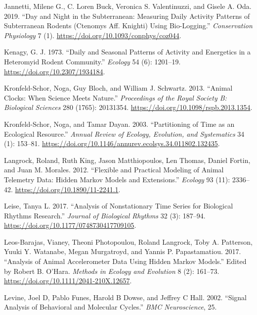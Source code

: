 \documentclass[msc,numbers,hidelinks]{coppe}
\newlength{\cslhangindent}
\newenvironment{CSLReferences}[2] %
 {%
  \setlength{\parindent}{0pt}
  \ifodd #1 \everypar{\setlength{\hangindent}{\cslhangindent}}\ignorespaces\fi
  \ifnum #2 > 0
  \setlength{\parskip}{#2\baselineskip}
  \fi
 }%
 {}
\begin{document}
\begin{CSLReferences}{1}{0}
  \leavevmode{}%
  Jannetti, Milene G., C. Loren Buck, Veronica S. Valentinuzzi, and Gisele A. Oda. 2019. {``Day and Night in the Subterranean: Measuring Daily Activity Patterns of Subterranean Rodents (Ctenomys Aff. Knighti) Using Bio-Logging.''} \emph{Conservation Physiology} 7 (1). \url{https://doi.org/10.1093/conphys/coz044}.

  \leavevmode{}%
  Kenagy, G. J. 1973. {``Daily and {Seasonal Patterns} of {Activity} and {Energetics} in a {Heteromyid Rodent Community}.''} \emph{Ecology} 54 (6): 1201--19. \url{https://doi.org/10.2307/1934184}.

  \leavevmode{}%
  Kronfeld-Schor, Noga, Guy Bloch, and William J. Schwartz. 2013. {``Animal Clocks: When Science Meets Nature.''} \emph{Proceedings of the Royal Society B: Biological Sciences} 280 (1765): 20131354. \url{https://doi.org/10.1098/rspb.2013.1354}.

  \leavevmode{}%
  Kronfeld-Schor, Noga, and Tamar Dayan. 2003. {``Partitioning of {Time} as an {Ecological Resource}.''} \emph{Annual Review of Ecology, Evolution, and Systematics} 34 (1): 153--81. \url{https://doi.org/10.1146/annurev.ecolsys.34.011802.132435}.

  \leavevmode{}%
  Langrock, Roland, Ruth King, Jason Matthiopoulos, Len Thomas, Daniel Fortin, and Juan M. Morales. 2012. {``Flexible and Practical Modeling of Animal Telemetry Data: Hidden Markov Models and Extensions.''} \emph{Ecology} 93 (11): 2336--42. \url{https://doi.org/10.1890/11-2241.1}.

  \leavevmode{}%
  Leise, Tanya L. 2017. {``Analysis of Nonstationary Time Series for Biological Rhythms Research.''} \emph{Journal of Biological Rhythms} 32 (3): 187--94. \url{https://doi.org/10.1177/0748730417709105}.

  \leavevmode{}%
  Leos-Barajas, Vianey, Theoni Photopoulou, Roland Langrock, Toby A. Patterson, Yuuki Y. Watanabe, Megan Murgatroyd, and Yannis P. Papastamatiou. 2017. {``Analysis of Animal Accelerometer Data Using Hidden Markov Models.''} Edited by Robert B. O'Hara. \emph{Methods in Ecology and Evolution} 8 (2): 161--73. \url{https://doi.org/10.1111/2041-210X.12657}.

  \leavevmode{}%
  Levine, Joel D, Pablo Funes, Harold B Dowse, and Jeffrey C Hall. 2002. {``Signal Analysis of Behavioral and Molecular Cycles.''} \emph{BMC Neuroscience}, 25.


\end{CSLReferences}
\end{document}
